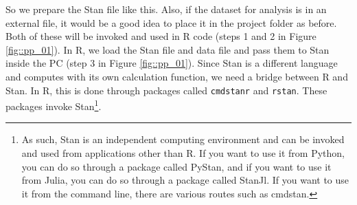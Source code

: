 \documentclass{ltjsbook}
\begin{document}
So we prepare the Stan file like this. Also, if the dataset for analysis is in an external file, it would be a good idea to place it in the project folder as before. Both of these will be invoked and used in R code (steps 1 and 2 in Figure \ref{fig::pp_01}). In R, we load the Stan file and data file and pass them to Stan inside the PC (step 3 in Figure \ref{fig::pp_01}). Since Stan is a different language and computes with its own calculation function, we need a bridge between R and Stan. In R, this is done through packages called \verb|cmdstanr| and \verb|rstan|. These packages invoke Stan\footnote{As such, Stan is an independent computing environment and can be invoked and used from applications other than R. If you want to use it from Python, you can do so through a package called PyStan, and if you want to use it from Julia, you can do so through a package called StanJl. If you want to use it from the command line, there are various routes such as cmdstan.}.
\end{document}
